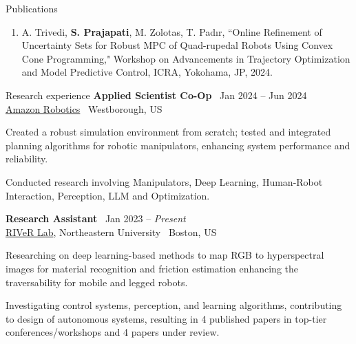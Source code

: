 \documentclass{resume}
\begin{document}
\begin{rSection}{Publications}
\begin{enumerate}[leftmargin=0.5cm]
    \item \vspace{-0.3em} A. Trivedi, \textbf{S. Prajapati}, M. Zolotas, T. Pad{\i}r, ``Online Refinement of Uncertainty Sets for Robust MPC of Quad-rupedal
    Robots Using Convex Cone Programming," Workshop on Advancements in Trajectory Optimization and Model Predictive Control, ICRA, Yokohama, JP, 2024.
\end{enumerate}
\end{rSection}
\begin{rSection}{Research experience}
{\bf Applied Scientist Co-Op} \hfill {\ Jan 2024 -- Jun 2024 }\\ 
{\href{https://www.aboutamazon.com/news/tag/robotics}{Amazon Robotics}} \hfill {\ {Westborough, US}}
\begin{cvitems}
    \item Created a robust simulation environment from scratch; tested and integrated planning algorithms for robotic manipulators, enhancing system performance and reliability.
    \item Conducted research involving Manipulators, Deep Learning, Human-Robot Interaction, Perception, LLM and Optimization.
\end{cvitems}
{\bf Research Assistant} \hfill {\ Jan 2023 -- \textit{Present} }\\ 
{\href{https://robot.neu.edu/}{RIVeR Lab}, Northeastern University} \hfill {\ {Boston, US}}
\begin{cvitems}
    \item Researching on deep learning-based methods to map RGB to hyperspectral images for material recognition and friction estimation enhancing the traversability for mobile and legged robots.
    \item Investigating control systems, perception, and learning algorithms, contributing to design of autonomous systems, resulting in 4 published papers in top-tier conferences/workshops and 4 papers under review.

\end{cvitems}
\end{rSection}
\end{document}
